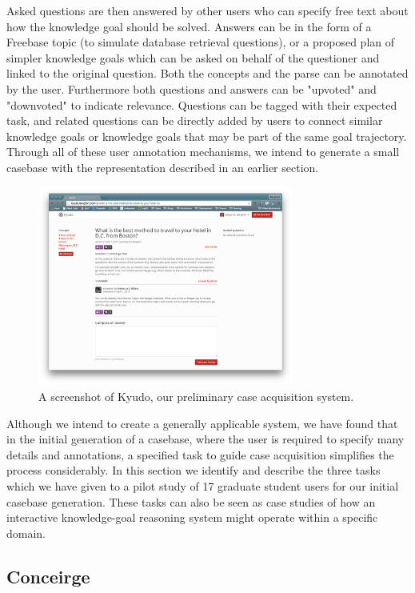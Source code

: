 \documentclass[11pt,letterpaper]{article}
\begin{document}
Asked questions are then answered by other users who can specify free text about how the knowledge goal should be solved. Answers can be in the form of a Freebase topic (to simulate database retrieval questions), or a proposed plan of simpler knowledge goals which can be asked on behalf of the questioner and linked to the original question. Both the concepts and the parse can be annotated by the user. Furthermore both questions and answers can be "upvoted" and "downvoted" to indicate relevance. Questions can be tagged with their expected task, and related questions can be directly added by users to connect similar knowledge goals or knowledge goals that may be part of the same goal trajectory. Through all of these user annotation mechanisms, we intend to generate a small casebase with the representation described in an earlier section.

\begin{figure}
	\centering
	    \includegraphics[width=0.75\textwidth]{figures/kyudo_screenshot.png}
    \caption{\label{fig:kyudo_screenshot.png}A screenshot of Kyudo, our preliminary case acquisition system.}
\end{figure}

Although we intend to create a generally applicable system, we have found that in the initial generation of a casebase, where the user is required to specify many details and annotations, a specified task to guide case acquisition simplifies the process considerably. In this section we identify and describe the three tasks which we have given to a pilot study of 17 graduate student users for our initial casebase generation. These tasks can also be seen as case studies of how an interactive knowledge-goal reasoning system might operate within a specific domain.

\subsection{Conceirge}
\end{document}
